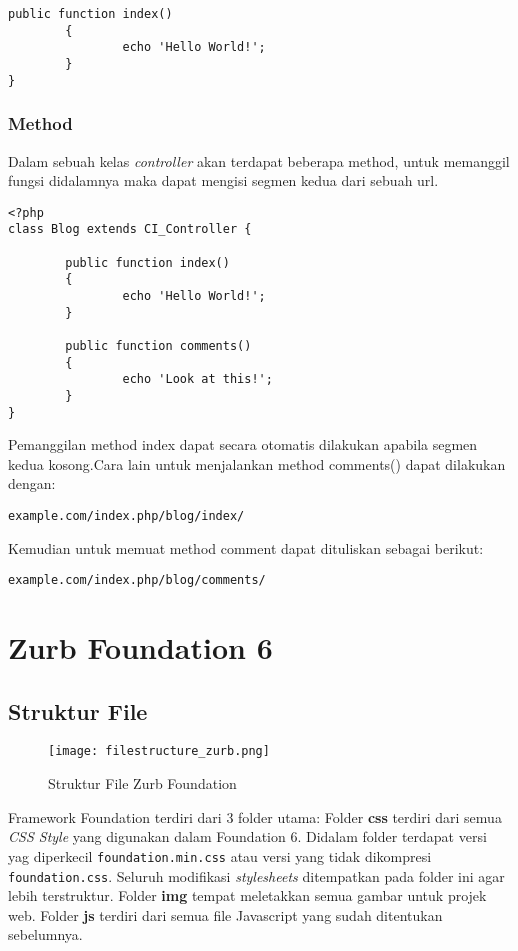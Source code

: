 \begin{enumerate}
\begin{lstlisting}[label=phpheg, frame=single]
        public function index()
        {
                echo 'Hello World!';
        }
}
\end{lstlisting} 

\subsubsection{Method}
\label{sssec:controller_1}
Dalam sebuah kelas \textit{controller} akan terdapat beberapa method, untuk memanggil fungsi didalamnya maka dapat mengisi segmen kedua dari sebuah url. \cite{codeigniter:17}
\begin{lstlisting}[label=phpheg, frame=single] 
<?php
class Blog extends CI_Controller {

        public function index()
        {
                echo 'Hello World!';
        }

        public function comments()
        {
                echo 'Look at this!';
        }
}
\end{lstlisting}

Pemanggilan method index dapat secara otomatis dilakukan apabila segmen kedua kosong.Cara lain untuk menjalankan method comments() dapat dilakukan dengan:
\begin{lstlisting}[frame=single] 
example.com/index.php/blog/index/
\end{lstlisting}

Kemudian untuk memuat method comment dapat dituliskan sebagai berikut:
\begin{lstlisting}[frame=single] 
example.com/index.php/blog/comments/
\end{lstlisting}

\section{Zurb Foundation 6}
\label{sec:zurb_foundation6}

\subsection{Struktur File}
\label{subs:strukturfile_zurb}
\begin{figure} [H]
	\centering  
	\texttt{[image: filestructure\_zurb.png]}  
	\caption{Struktur File Zurb Foundation}
	\label{fig:filestructure_zurb} 
\end{figure}

Framework Foundation terdiri dari 3 folder utama:
Folder \textbf{css} terdiri dari semua \textit{CSS Style} yang digunakan dalam Foundation 6. Didalam folder terdapat versi yag diperkecil \verb|foundation.min.css| atau versi yang tidak dikompresi \verb|foundation.css|. Seluruh modifikasi \textit{stylesheets} ditempatkan pada folder ini agar lebih terstruktur.
Folder \textbf{img} tempat meletakkan semua gambar untuk projek web.
Folder \textbf{js} terdiri dari semua file Javascript yang sudah ditentukan sebelumnya.\cite{zurbfoundation:17}


\end{enumerate}
